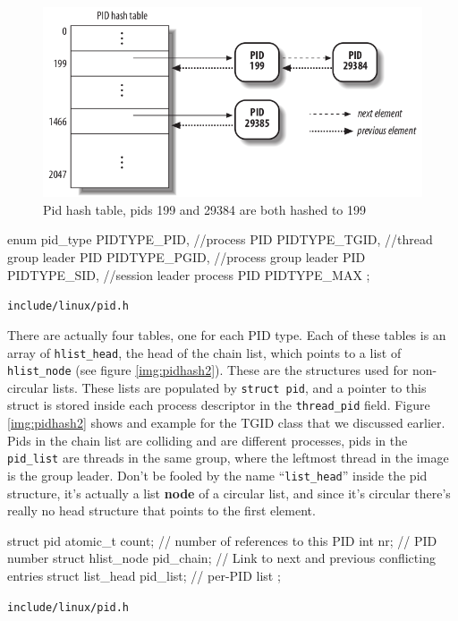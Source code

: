 \documentclass[10pt]{book}
\begin{document}
\begin{figure}[ht]
\includegraphics[width=\textwidth]{images/pidhash1.png}
\caption{Pid hash table, pids 199 and 29384 are both hashed to 199}
\label{img:pidhash1}
\end{figure}

\begin{code}
enum pid_type {
	PIDTYPE_PID,  //process PID
	PIDTYPE_TGID, //thread group leader PID
	PIDTYPE_PGID, //process group leader PID
	PIDTYPE_SID,  //session leader process PID
	PIDTYPE_MAX
};
\end{code}
\verb|include/linux/pid.h|

There are actually four tables, one for each PID type. Each of these tables is an array of \verb|hlist_head|, the head of the chain list, which points to a list of \verb|hlist_node| (see figure \ref{img:pidhash2}). These are the structures used for non-circular lists. These lists are populated by \verb|struct pid|, and a pointer to this struct is stored inside each process descriptor in the \verb|thread_pid| field. Figure \ref{img:pidhash2} shows and example for the TGID class that we discussed earlier. Pids in the chain list are colliding and are different processes, pids in the \verb|pid_list| are threads in the same group, where the leftmost thread in the image is the group leader. Don't be fooled by the name ``\verb|list_head|'' inside the pid structure, it's actually a list \textbf{node} of a circular list, and since it's circular there's really no head structure that points to the first element. %

\begin{code}
struct pid {
        atomic_t count; // number of references to this PID
	int nr; // PID number
	struct hlist_node pid_chain; // Link to next and previous conflicting entries
	struct list_head pid_list;  // per-PID list
};
\end{code}
\verb|include/linux/pid.h|
\end{document}
